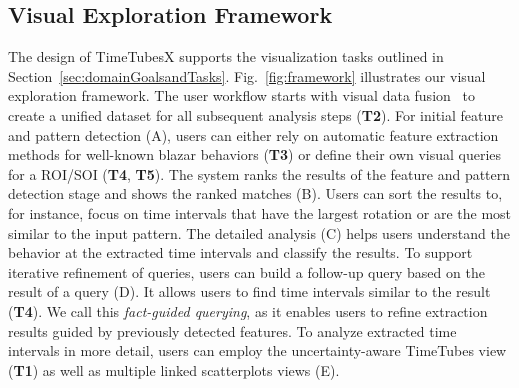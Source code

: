 \subsection{Visual Exploration Framework\label{sec:approach}}
The design of TimeTubesX supports the visualization tasks outlined in Section~\ref{sec:domainGoalsandTasks}.
Fig.~\ref{fig:framework} illustrates our visual exploration framework.
%
The user workflow starts with visual data fusion~\cite{Fujishiro2018} to create a unified dataset for all subsequent analysis steps (\textbf{T2}).
For initial feature and pattern detection (A), users can either rely on automatic feature extraction methods for well-known blazar behaviors (\textbf{T3}) or define their own visual queries for a ROI/SOI (\textbf{T4}, \textbf{T5}).
The system ranks the results of the feature and pattern detection stage and shows the ranked matches (B).
Users can sort the results to, for instance, focus on time intervals that have the largest rotation or are the most similar to the input pattern.
%
The detailed analysis (C) helps users understand the behavior at the extracted time intervals and classify the results. 
To support iterative refinement of queries, users can build a follow-up query based on the result of a query (D). It allows users to find time intervals similar to the result (\textbf{T4}).
We call this \textit{fact-guided querying}, as it enables users to refine extraction results guided by previously detected features.
To analyze extracted time intervals in more detail, users can employ
the uncertainty-aware TimeTubes view (\textbf{T1}) as well as multiple linked scatterplots views (E).

